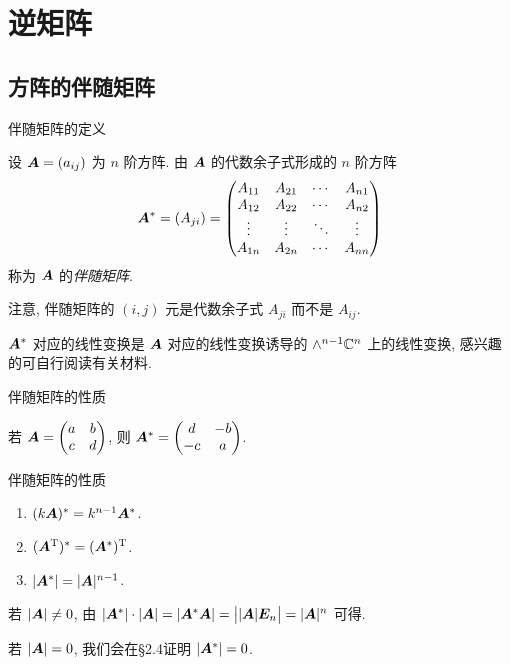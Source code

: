 \section{逆矩阵}

\subsection{方阵的伴随矩阵}

\begin{frame}{伴随矩阵的定义}
	\onslide<+->
	\begin{definition}
		设 ${\boldsymbol{A}}=(a_{ij})$ 为 $n$ 阶方阵.
		由 ${\boldsymbol{A}}$ 的代数余子式形成的 $n$ 阶方阵
		\[{\boldsymbol{A}}^*=(A_{ji})=\begin{pmatrix}
			A_{11}&A_{21}&\cdots&A_{n1}\\
			A_{12}&A_{22}&\cdots&A_{n2}\\
			\vdots&\vdots&\ddots&\vdots\\
			A_{1n}&A_{2n}&\cdots&A_{nn}
		\end{pmatrix}\]
		称为 ${\boldsymbol{A}}$ 的\emph{伴随矩阵}.
	\end{definition}
	\onslide<+->
	注意, 伴随矩阵的 $(i,j)$ 元是代数余子式 \alert{$A_{ji}$ 而不是 $A_{ij}$}.

	\onslide<+->
	${\boldsymbol{A}}^*$ 对应的线性变换是 ${\boldsymbol{A}}$ 对应的线性变换诱导的 $\wedge^{n-1}{\mathbb{C}}^n$ 上的线性变换, 感兴趣的可自行阅读有关材料.
\end{frame}


\begin{frame}{伴随矩阵的性质}
	\onslide<+->
	\begin{example}
		若 ${\boldsymbol{A}}=\begin{pmatrix}
			a&b\\c&d
		\end{pmatrix}$, 则 ${\boldsymbol{A}}^*=\begin{pmatrix}
			d&-b\\-c&a
		\end{pmatrix}$.
	\end{example}
	\onslide<+->
	\begin{second}{伴随矩阵的性质}
		\begin{enumerate}
			\item $(k{\boldsymbol{A}})^*=k^{n-1}{\boldsymbol{A}}^*$.
			\item $({\boldsymbol{A}}^{\mathrm{T}})^*=({\boldsymbol{A}}^*)^{\mathrm{T}}$.
			\item \alert{$|{\boldsymbol{A}}^*|=|{\boldsymbol{A}}|^{n-1}$}.
		\end{enumerate}
	\end{second}
	\onslide<+->
	若 $|{\boldsymbol{A}}|\neq0$, 由 $|{\boldsymbol{A}}^*|\cdot|{\boldsymbol{A}}|=|{\boldsymbol{A}}^*{\boldsymbol{A}}|=\bigl||{\boldsymbol{A}}|{\boldsymbol{E}}_n\bigr|=|{\boldsymbol{A}}|^n$ 可得.

	\onslide<+->
	若 $|{\boldsymbol{A}}|=0$, 我们会在\S2.4证明 $|{\boldsymbol{A}}^*|=0$.
\end{frame}


